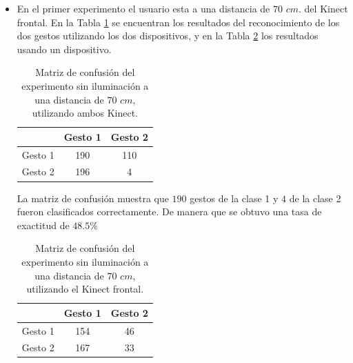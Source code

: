 \begin{itemize}

\item En el primer experimento el usuario esta a una distancia de $70$ $cm.$ del Kinect frontal. En la Tabla \ref{table:70LnoK2} se encuentran los resultados del reconocimiento de los dos gestos utilizando los dos dispositivos, y en la Tabla \ref{table:70LnoK1} los resultados usando un dispositivo.   


\begin{table}[h!] 
\begin{center}
\begin{tabular}{ r || c | c |} 
 
        & Gesto 1 & Gesto 2 \\ \hline \hline  
Gesto 1 & 190     &  110     \\ \hline  
Gesto 2 & 196     &  4     \\   

\end{tabular}
\end{center} 
\caption{Matriz de confusión del experimento sin iluminación a una distancia de $70$ $cm$, utilizando ambos Kinect.} 
\label{table:70LnoK2}
\end{table}  

La matriz de confusión muestra que $190$ gestos de la clase 1 y $4$ de la clase 2 fueron clasificados correctamente. De manera que se obtuvo una tasa de exactitud de $48.5 \%$ 

\begin{table}[h!] 
\begin{center}
\begin{tabular}{ r || c | c |} 
        & Gesto 1 & Gesto 2 \\ \hline \hline  
Gesto 1 & 154     &  46     \\ \hline  
Gesto 2 & 167     &  33     \\   
\end{tabular}
\end{center} 
\caption{Matriz de confusión del experimento sin iluminación a una distancia de $70$ $cm$, utilizando el Kinect frontal.}
\label{table:70LnoK1} 
\end{table}  


\end{itemize}
